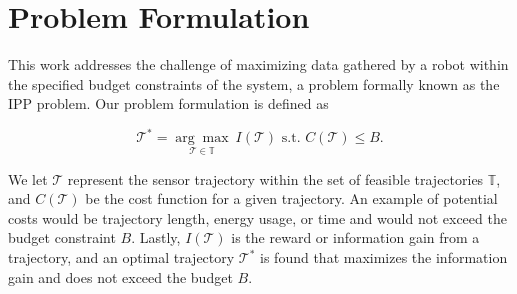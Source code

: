 \section{Problem Formulation}\label{sec:problem}


This work addresses the challenge of maximizing data gathered by a robot within the specified budget constraints of the system, a problem formally known as the IPP problem. 
Our problem formulation is defined as

\begin{equation*}
    \mathcal{T}^*=\underset{\mathcal{T}\in \mathbb{T}}{\arg\max}~I(\mathcal{T}) \text{ s.t.\ $C(\mathcal{T}) \leq B$}.
\end{equation*}

We let $\mathcal{T}$ represent the sensor trajectory within the set of feasible trajectories $\mathbb{T}$, and $C(\mathcal{T})$ be the cost function for a given trajectory. An example of potential costs would be trajectory length, energy usage, or time and would not exceed the budget constraint $B$. Lastly, $I(\mathcal{T})$ is the reward or information gain from a trajectory, and an optimal trajectory $\mathcal{T}^*$ is found that maximizes the information gain and does not exceed the budget $B$. 

